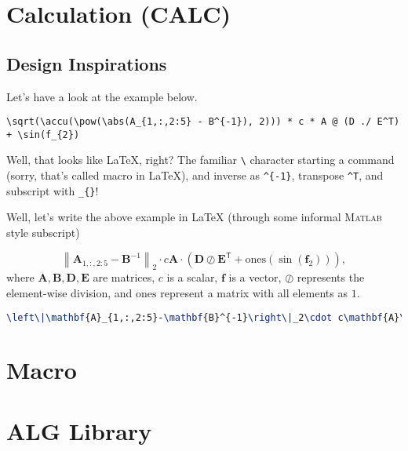 \section{Calculation (CALC)}\label{d:sec:calc}
\subsection{Design Inspirations}
Let's have a look at the example below.
\begin{lstlisting}[language=mmcesim-sim]
\sqrt(\accu(\pow(\abs(A_{1,:,2:5} - B^{-1}), 2))) * c * A @ (D ./ E^T) + \sin(f_{2})
\end{lstlisting}
Well, that looks like \LaTeX{}, right?
The familiar \texttt{\textbackslash} character starting a command
(sorry, that's called macro in \LaTeX{}),
and inverse as \verb|^{-1}|, transpose \verb|^T|, and subscript with \verb|_{}|!

Well, let's write the above example in LaTeX (through some informal \textsc{Matlab} style subscript)
\begin{example}
  \begin{equation}
    \left\|\mathbf{A}_{1,:,2:5}-\mathbf{B}^{-1}\right\|_2\cdot c\mathbf{A}\cdot\left(\mathbf{D}\oslash\mathbf{E}^\mathsf{T}+\mathrm{ones}(\sin(\mathbf{f}_2))\right),
  \end{equation}
  where $\mathbf{A},\mathbf{B},\mathbf{D},\mathbf{E}$ are matrices,
  $c$ is a scalar, $\mathbf{f}$ is a vector, $\oslash$ represents the element-wise division,
  and $\mathrm{ones}$ represent a matrix with all elements as $1$.
  \begin{lstlisting}[language=tex]
\left\|\mathbf{A}_{1,:,2:5}-\mathbf{B}^{-1}\right\|_2\cdot c\mathbf{A}\cdot\left(\mathbf{D}\oslash\mathbf{E}^\mathsf{T}+\mathrm{ones}(\sin(\mathbf{f}_2))\right)
  \end{lstlisting}
\end{example}

\section{Macro}

\section{ALG Library}\label{d:sec:alg_lib}
